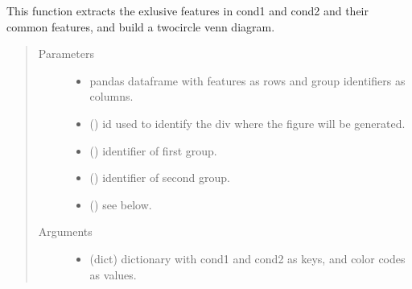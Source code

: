 \documentclass[letterpaper,10pt,english]{sphinxmanual}
\begin{document}
\begin{fulllineitems}
\label{\detokenize{_autosummary/analytics_core.viz:analytics_core.viz.viz.get_2_venn_diagram}}
This function extracts the exlusive features in cond1 and cond2 and their common features, and build a two\sphinxhyphen{}circle venn diagram.
\begin{quote}\begin{description}
\item[{Parameters}] \leavevmode\begin{itemize}
\item {} 
 \textendash{} pandas dataframe with features as rows and group identifiers as columns.

\item {} 
 () \textendash{} id used to identify the div where the figure will be generated.

\item {} 
 () \textendash{} identifier of first group.

\item {} 
 () \textendash{} identifier of second group.

\item {} 
 () \textendash{} see below.

\end{itemize}

\item[{Arguments}] \leavevmode\begin{itemize}
\item {} 
 (dict) \textendash{} dictionary with cond1 and cond2 as keys, and color codes as values.


\end{itemize}
\end{description}
\end{quote}
\end{fulllineitems}
\end{document}
